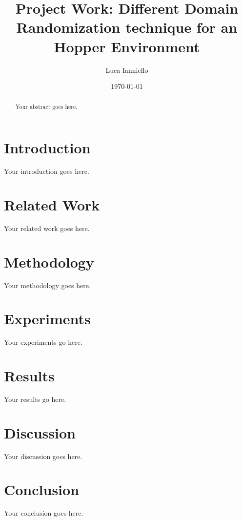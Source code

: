 \documentclass[12pt]{article}
\title{Project Work: Different Domain Randomization technique for an Hopper Environment}
\author{Luca Ianniello}
\date{\today}
\begin{document}
\maketitle

\begin{abstract}
Your abstract goes here.
\end{abstract}

\section{Introduction}
Your introduction goes here.

\section{Related Work}
Your related work goes here.

\section{Methodology}
Your methodology goes here.

\section{Experiments}
Your experiments go here.

\section{Results}
Your results go here.

\section{Discussion}
Your discussion goes here.

\section{Conclusion}
Your conclusion goes here.



\end{document}
